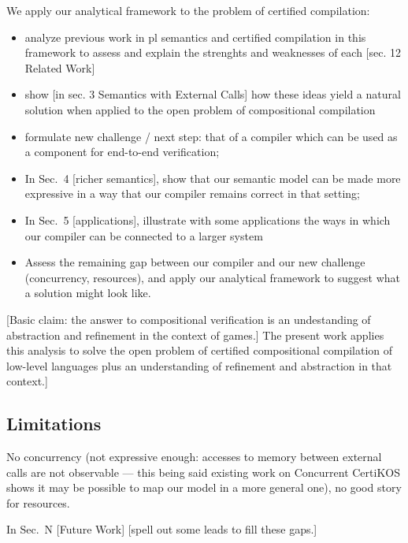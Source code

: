 {We apply our analytical framework to the problem of certified compilation:
\begin{itemize}
\item analyze previous work in pl semantics and certified compilation
  in this framework to assess and explain the strenghts and weaknesses of each
  [sec. 12 Related Work]
\item show [in sec. 3 Semantics with External Calls]
  how these ideas yield a natural solution
  when applied to the open problem of compositional compilation
\item formulate new challenge / next step:
  that of a compiler which can be used as a component
  for end-to-end verification;
\item In Sec.~4 [richer semantics],
  show that our semantic model can be made more expressive
  in a way that our compiler remains correct in that setting;
\item In Sec.~5 [applications],
  illustrate with some applications
  the ways in which our compiler can be connected
  to a larger system
\item Assess the remaining gap between our compiler
  and our new challenge (concurrency, resources),
  and apply our analytical framework to suggest
  what a solution might look like.
\end{itemize}

[Basic claim: the answer to compositional verification
is an undestanding of abstraction and refinement in the context of games.]
The present work applies this analysis to
solve the open problem of certified compositional compilation of low-level languages
plus an understanding of refinement and abstraction in that context.]

\subsection{Limitations}

No concurrency
(not expressive enough:
accesses to memory between external calls are not observable
--- this being said existing work on Concurrent CertiKOS shows
it may be possible to map our model in a more general one),
no good story for resources.

In Sec.~N [Future Work] [spell out some leads to fill these gaps.]

} %
